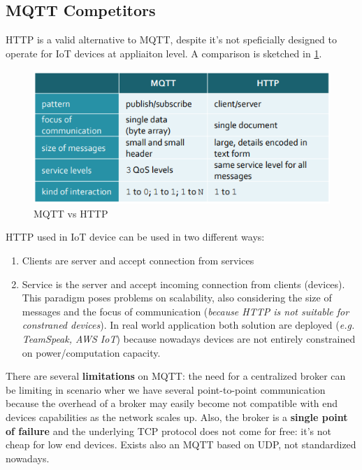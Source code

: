 \documentclass[10pt,a4paper]{report}
\theoremstyle{definition}
\begin{document}
\subsection{MQTT Competitors}\label{sec:mqtt-competitors}
HTTP is a valid alternative to MQTT, despite it's not speficially designed to operate for IoT devices at appliaiton level. A comparison is sketched in \ref{mqtt-vs-http}.
\begin{figure}[h!]
	\centering\includegraphics[scale=0.70]{images/Pasted image 20230307112648.png}
	\caption{MQTT vs HTTP}\label{mqtt-vs-http}\end{figure}

HTTP used in IoT device can be used in two different ways:
\begin{enumerate}
	\item 
	Clients are server and accept connection from services
	\item 
	Service is the server and accept incoming connection from clients (devices). 	This paradigm poses problems on scalability, also considering the size of messages and the focus of communication (\textit{because HTTP is not suitable for constraned devices}).
	In real world application both solution are deployed (\textit{e.g. TeamSpeak, AWS IoT}) because nowadays devices are not entirely constrained on power/computation capacity.
\end{enumerate}

There are several \textbf{limitations} on MQTT: the need for a centralized broker can be limiting in scenario wher we have several point-to-point communication because the overhead of a broker may easily become not compatible with end devices capabilities as the network scales up. Also, the broker is a \textbf{single point of failure} and the underlying TCP protocol does not come for free: it's not cheap for low end devices. Exists also an MQTT based on UDP, not standardized nowadays.
\end{document}
